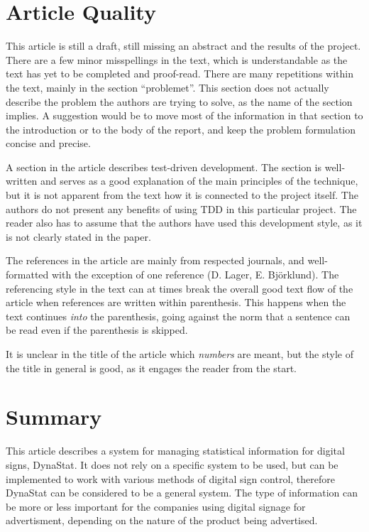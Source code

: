 \documentclass[a4paper,10pt]{article}
\begin{document}
\section{Article Quality}
This article is still a draft, still missing an abstract and the results of the project. There are a few minor misspellings in the text, which is understandable as the text has yet to be completed and proof-read. There are many repetitions within the text, mainly in the section ``problemet''. This section does not actually describe the problem the authors are trying to solve, as the name of the section implies. A suggestion would be to move most of the information in that section to the introduction or to the body of the report, and keep the problem formulation concise and precise.

A section in the article describes test-driven development. The section is well-written and serves as a good explanation of the main principles of the technique, but it is not apparent from the text how it is connected to the project itself. The authors do not present any benefits of using TDD in this particular project. The reader also has to assume that the authors have used this development style, as it is not clearly stated in the paper.

The references in the article are mainly from respected journals, and well-formatted with the exception of one reference (D. Lager, E. Björklund). The referencing style in the text can at times break the overall good text flow of the article when references are written within parenthesis. This happens when the text continues \emph{into} the parenthesis, going against the norm that a sentence can be read even if the parenthesis is skipped.

It is unclear in the title of the article which \emph{numbers} are meant, but the style of the title in general is good, as it engages the reader from the start.


\section{Summary}
This article describes a system for managing statistical information for digital signs, DynaStat. It does not rely on a specific system to be used, but can be implemented to work with various methods of digital sign control, therefore DynaStat can be considered to be a general system. The type of information can be more or less important for the companies using digital signage for advertisment, depending on the nature of the product being advertised.
\end{document}
